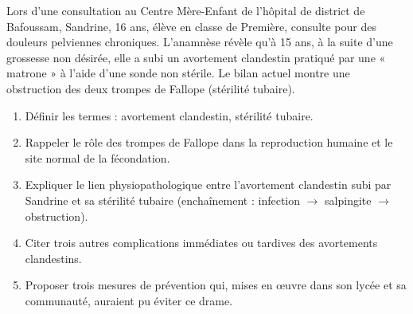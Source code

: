 \documentclass[11pt]{article}
\begin{document}
\begin{exercice}
Lors d'une consultation au Centre Mère-Enfant de l'hôpital de district de Bafoussam, Sandrine, 16 ans, élève en classe de Première, consulte pour des douleurs pelviennes chroniques. L'anamnèse révèle qu'à 15 ans, à la suite d'une grossesse non désirée, elle a subi un avortement clandestin pratiqué par une « matrone » à l'aide d'une sonde non stérile. Le bilan actuel montre une obstruction des deux trompes de Fallope (stérilité tubaire).
\begin{enumerate}
\item Définir les termes : avortement clandestin, stérilité tubaire.
\item Rappeler le rôle des trompes de Fallope dans la reproduction humaine et le site normal de la fécondation.
\item Expliquer le lien physiopathologique entre l'avortement clandestin subi par Sandrine et sa stérilité tubaire (enchaînement : infection $\rightarrow$ salpingite $\rightarrow$ obstruction).
\item Citer trois autres complications immédiates ou tardives des avortements clandestins.
\item Proposer trois mesures de prévention qui, mises en œuvre dans son lycée et sa communauté, auraient pu éviter ce drame.
\end{enumerate}
\end{exercice}
\end{document}
